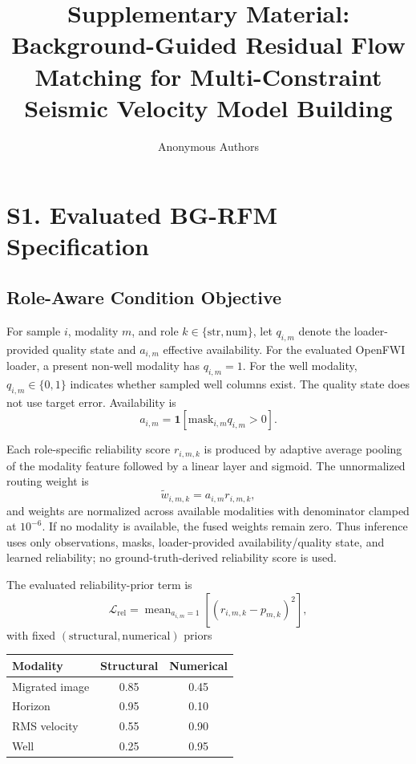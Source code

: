 \documentclass[11pt]{article}
\title{Supplementary Material: Background-Guided Residual Flow Matching for Multi-Constraint Seismic Velocity Model Building}
\author{Anonymous Authors}
\date{}
\begin{document}
\maketitle

\section{S1. Evaluated BG-RFM Specification}

\subsection{Role-Aware Condition Objective}

For sample $i$, modality $m$, and role $k\in\{\mathrm{str},\mathrm{num}\}$, let $q_{i,m}$ denote the loader-provided quality state and $a_{i,m}$ effective availability. For the evaluated OpenFWI loader, a present non-well modality has $q_{i,m}=1$. For the well modality, $q_{i,m}\in\{0,1\}$ indicates whether sampled well columns exist. The quality state does not use target error. Availability is
\begin{equation}
a_{i,m}
=
\mathbf{1}\!\left[\mathrm{mask}_{i,m}q_{i,m}>0\right].
\end{equation}

Each role-specific reliability score $r_{i,m,k}$ is produced by adaptive average pooling of the modality feature followed by a linear layer and sigmoid. The unnormalized routing weight is
\begin{equation}
\widetilde w_{i,m,k}=a_{i,m}r_{i,m,k},
\end{equation}
and weights are normalized across available modalities with denominator clamped at $10^{-6}$. If no modality is available, the fused weights remain zero. Thus inference uses only observations, masks, loader-provided availability/quality state, and learned reliability; no ground-truth-derived reliability score is used.

The evaluated reliability-prior term is
\begin{equation}
\mathcal L_{\mathrm{rel}}
=
\operatorname{mean}_{a_{i,m}=1}
\left[
(r_{i,m,k}-p_{m,k})^2
\right],
\end{equation}
with fixed $(\mathrm{structural},\mathrm{numerical})$ priors
\begin{center}
\begin{tabular}{lcc}
\toprule
Modality & Structural & Numerical \\
\midrule
Migrated image & 0.85 & 0.45 \\
Horizon & 0.95 & 0.10 \\
RMS velocity & 0.55 & 0.90 \\
Well & 0.25 & 0.95 \\
\bottomrule
\end{tabular}
\end{center}
\end{document}
